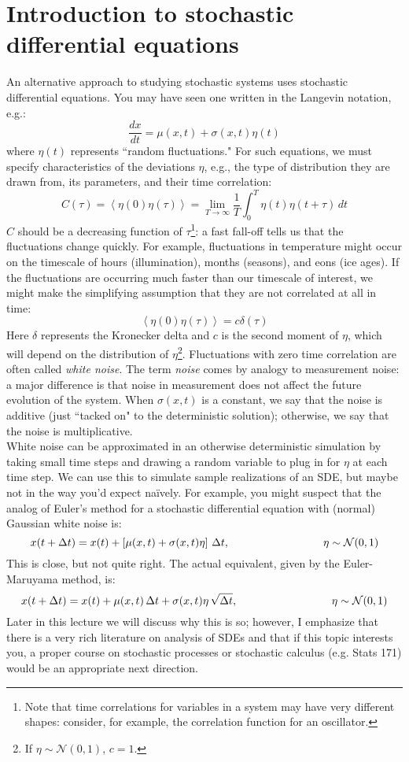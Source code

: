 \documentclass{article}
\begin{document}
\large

\section*{Introduction to stochastic differential equations}
An alternative approach to studying stochastic systems uses stochastic differential equations. You may have seen one written in the Langevin notation, e.g.:
\[ \frac{dx}{dt} = \mu(x,t) + \sigma (x,t) \eta (t) \]
where $\eta(t)$ represents ``random fluctuations." For such equations, we must specify characteristics of the deviations $\eta$, e.g., the type of distribution they are drawn from, its parameters, and their time correlation:
\[ C(\tau) = \left< \eta(0) \eta(\tau) \right> = \lim_{T \to \infty} \frac{1}{T} \int_0^{T} \eta(t)\eta(t+\tau)\, dt \]
$C$ should be a decreasing function of $\tau$\footnote{Note that time correlations for variables in a system may have very different shapes: consider, for example, the correlation function for an oscillator.}: a fast fall-off tells us that the fluctuations change quickly. For example, fluctuations in temperature might occur on the timescale of hours (illumination), months (seasons), and eons (ice ages). If the fluctuations are occurring much faster than our timescale of interest, we might make the simplifying assumption that they are not correlated at all in time:
\[ \left< \eta(0) \eta(\tau) \right> = c \delta(\tau) \]
Here $\delta$ represents the Kronecker delta and $c$ is the second moment of $\eta$, which will depend on the distribution of $\eta$\footnote{If $\eta \sim \mathcal{N}(0,1)$, $c=1$.}. Fluctuations with zero time correlation are often called \textit{white noise}. The term \textit{noise} comes by analogy to measurement noise: a major difference is that noise in measurement does not affect the future evolution of the system. When $\sigma(x,t)$ is a constant, we say that the noise is additive (just ``tacked on" to the deterministic solution); otherwise, we say that the noise is multiplicative.\\

White noise can be approximated in an otherwise deterministic simulation by taking small time steps and drawing a random variable to plug in for $\eta$ at each time step. We can use this to simulate sample realizations of an SDE, but maybe not in the way you'd expect na\"{i}vely. For example, you might suspect that the analog of Euler's method for a stochastic differential equation with (normal) Gaussian white noise is:
\[ x(t+\Delta t) = x(t) + \left[ \mu(x,t) + \sigma(x,t) \eta\right] \, \Delta t,   \hspace{3 cm} \eta \sim \mathcal{N}(0,1) \]
This is close, but not quite right. The actual equivalent, given by the Euler-Maruyama method, is:
\[ x(t+\Delta t) = x(t) + \mu(x,t) \, \Delta t + \sigma(x,t) \eta \, \sqrt{\Delta t},   \hspace{3 cm} \eta \sim \mathcal{N}(0,1) \]
Later in this lecture we will discuss why this is so; however, I emphasize that there is a very rich literature on analysis of SDEs and that if this topic interests you, a proper course on stochastic processes or stochastic calculus (e.g. Stats 171) would be an appropriate next direction.\\
\end{document}
